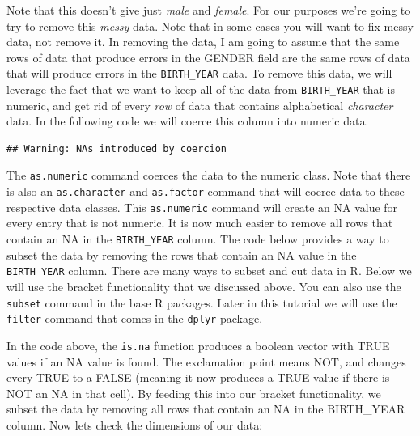 \documentclass[]{book}
\newenvironment{Shaded}{\begin{snugshade}}{\end{snugshade}}
\newcommand{\KeywordTok}[1]{\textcolor[rgb]{0.13,0.29,0.53}{\textbf{{#1}}}}
\newcommand{\StringTok}[1]{\textcolor[rgb]{0.31,0.60,0.02}{{#1}}}
\newcommand{\NormalTok}[1]{{#1}}
\begin{document}
Note that this doesn't give just \emph{male} and \emph{female}. For our
purposes we're going to try to remove this \emph{messy} data. Note that
in some cases you will want to fix messy data, not remove it. In
removing the data, I am going to assume that the same rows of data that
produce errors in the GENDER field are the same rows of data that will
produce errors in the \texttt{BIRTH\_YEAR} data. To remove this data, we
will leverage the fact that we want to keep all of the data from
\texttt{BIRTH\_YEAR} that is numeric, and get rid of every \emph{row} of
data that contains alphabetical \emph{character} data. In the following
code we will coerce this column into numeric data.

\begin{Shaded}
\end{Shaded}

\begin{verbatim}
## Warning: NAs introduced by coercion
\end{verbatim}

The \texttt{as.numeric} command coerces the data to the numeric class.
Note that there is also an \texttt{as.character} and \texttt{as.factor}
command that will coerce data to these respective data classes. This
\texttt{as.numeric} command will create an NA value for every entry that
is not numeric. It is now much easier to remove all rows that contain an
NA in the \texttt{BIRTH\_YEAR} column. The code below provides a way to
subset the data by removing the rows that contain an NA value in the
\texttt{BIRTH\_YEAR} column. There are many ways to subset and cut data
in R. Below we will use the bracket functionality that we discussed
above. You can also use the \texttt{subset} command in the base R
packages. Later in this tutorial we will use the \texttt{filter} command
that comes in the \texttt{dplyr} package.

\begin{Shaded}
\end{Shaded}

In the code above, the \texttt{is.na} function produces a boolean vector
with TRUE values if an NA value is found. The exclamation point means
NOT, and changes every TRUE to a FALSE (meaning it now produces a TRUE
value if there is NOT an NA in that cell). By feeding this into our
bracket functionality, we subset the data by removing all rows that
contain an NA in the BIRTH\_YEAR column. Now lets check the dimensions
of our data:
\end{document}
